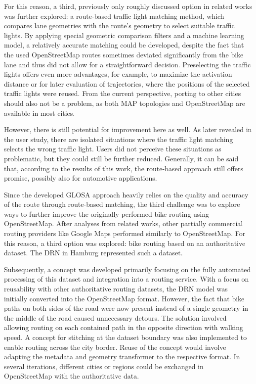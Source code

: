 For this reason, a third, previously only roughly discussed option in related works was further explored: a route-based traffic light matching method, which compares lane geometries with the route's geometry to select suitable traffic lights. By applying special geometric comparison filters and a machine learning model, a relatively accurate matching could be developed, despite the fact that the used OpenStreetMap routes sometimes deviated significantly from the bike lane and thus did not allow for a straightforward decision. Preselecting the traffic lights offers even more advantages, for example, to maximize the activation distance or for later evaluation of trajectories, where the positions of the selected traffic lights were reused. From the current perspective, porting to other cities should also not be a problem, as both MAP topologies and OpenStreetMap are available in most cities.

However, there is still potential for improvement here as well. As later revealed in the user study, there are isolated situations where the traffic light matching selects the wrong traffic light. Users did not perceive these situations as problematic, but they could still be further reduced. Generally, it can be said that, according to the results of this work, the route-based approach still offers promise, possibly also for automotive applications.

Since the developed GLOSA approach heavily relies on the quality and accuracy of the route through route-based matching, the third challenge was to explore ways to further improve the originally performed bike routing using OpenStreetMap. After analyses from related works, other partially commercial routing providers like Google Maps performed similarly to OpenStreetMap. For this reason, a third option was explored: bike routing based on an authoritative dataset. The DRN in Hamburg represented such a dataset.

Subsequently, a concept was developed primarily focusing on the fully automated processing of this dataset and integration into a routing service. With a focus on reusability with other authoritative routing datasets, the DRN model was initially converted into the OpenStreetMap format. However, the fact that bike paths on both sides of the road were now present instead of a single geometry in the middle of the road caused unnecessary detours. The solution involved allowing routing on each contained path in the opposite direction with walking speed. A concept for stitching at the dataset boundary was also implemented to enable routing across the city border. Reuse of the concept would involve adapting the metadata and geometry transformer to the respective format. In several iterations, different cities or regions could be exchanged in OpenStreetMap with the authoritative data.

